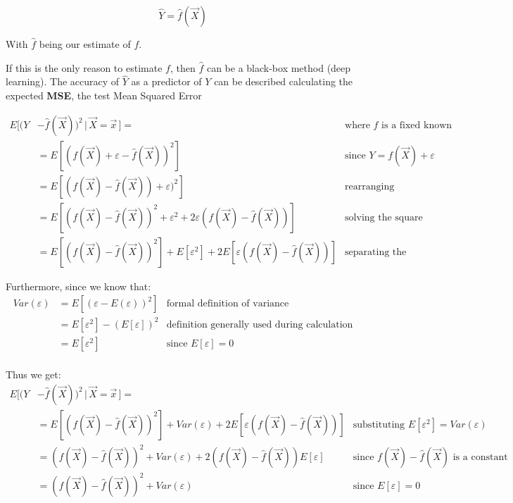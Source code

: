       $$\hat{Y} = \hat{f} (\vec{X})$$

      With $\hat{f}$ being our estimate of $f$.
      
      If this is the only reason to estimate $f$, then $\hat{f}$ can be a black-box method (deep learning).
      The accuracy of $\hat{Y}$ as a predictor of $Y$ can be described calculating the expected \textbf{MSE}, the test Mean Squared Error %

      \begin{align*}
        E[(Y&-\hat{f}(\vec{X}))^2 \,|\, \vec{X} = \vec{x}\,] = 
        & \text{where } \hat{f} \text{ is a fixed known function}\\
        & = E[(f(\vec{X}) + \varepsilon - \hat{f}(\vec{X}))^2]
        & \text{since } Y = f(\vec{X}) + \varepsilon \\
        & = E[(f(\vec{X}) - \hat{f}(\vec{X})) + \varepsilon)^2]
        & \text{rearranging} \\
        & = E[(f(\vec{X}) - \hat{f}(\vec{X}))^2 + \varepsilon^2 + 2\varepsilon(f(\vec{X}) - \hat{f}(\vec{X}))]
        & \text{solving the square} \\
        & = E[(f(\vec{X}) - \hat{f}(\vec{X}))^2] + E[\varepsilon^2] + 2E[\varepsilon(f(\vec{X}) - \hat{f}(\vec{X}))]
        & \text{separating the expectations}
      \end{align*}
      
      Furthermore, since we know that:
      \begin{align*}
        Var(\varepsilon) 
        & = E[(\varepsilon - E(\varepsilon))^2]
        & \text{formal definition of variance} \\
        & = E[\varepsilon^2] - (E[\varepsilon])^2  
        & \text{definition generally used during calculation} \\
        & = E[\varepsilon^2] 
        & \text{since } E[\varepsilon] = 0 \\
      \end{align*}

      Thus we get:
      \begin{align*}
        E[(Y&-\hat{f}(\vec{X}))^2 \,|\, \vec{X} = \vec{x}\,] = \\
        & = E[(f(\vec{X}) - \hat{f}(\vec{X}))^2] + Var(\varepsilon) + 2E[\varepsilon(f(\vec{X}) - \hat{f}(\vec{X}))]
        & \text{substituting } E[\varepsilon^2] = Var(\varepsilon) \\
        & = (f(\vec{X}) - \hat{f}(\vec{X}))^2 + Var(\varepsilon) + 2(f(\vec{X}) - \hat{f}(\vec{X}))E[\varepsilon]
        & \text{since } f(\vec{X}) - \hat{f}(\vec{X}) \text{ is a constant}\\
        & = (f(\vec{X}) - \hat{f}(\vec{X}))^2 + Var(\varepsilon)
        & \text{since } E[\varepsilon] = 0 \\
      \end{align*}

